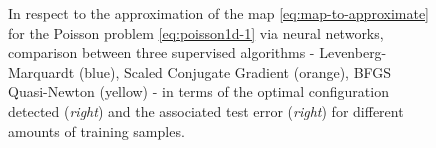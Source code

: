 \documentclass[12pt, a4paper, twoside, openright]{report}
\numberwithin{equation}{chapter}
\theoremstyle{theorem}
\theoremstyle{definition}
\theoremstyle{remark}
\theoremstyle{proposition}
\numberwithin{figure}{chapter}
\begin{document}
\begin{figure}[t!]
			
			\caption{In respect to the approximation of the map \eqref{eq:map-to-approximate} for the Poisson problem \eqref{eq:poisson1d-1} via neural networks, comparison between three supervised algorithms - Levenberg-Marquardt (blue), Scaled Conjugate Gradient (orange), BFGS Quasi-Newton (yellow) - in terms of the optimal configuration detected (\emph{right}) and the associated test error (\emph{right}) for different amounts of training samples.}
			\label{fig:poisson1d-1-fig2}
		

\end{figure}
\end{document}
